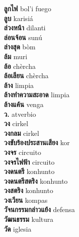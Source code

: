 \textbf{ ลูกไฟ  } bol’i fuego \\
\textbf{ ลูบ  } karisiá \\
\textbf{ ล่วงหน้า  } dilanti \\
\textbf{ ล่อนจ้อน  } sunú \\
\textbf{ ล่างสุด  } bòm \\
\textbf{ ล้ม  } muri \\
\textbf{ ล้อ  } chèrcha \\
\textbf{ ล้อเลียน  } chèrcha \\
\textbf{ ล้าง  } limpia \\
\textbf{ ล้างทำความสะอาด  } limpia \\
\textbf{ ล้างแค้น  } venga \\
\textbf{ ว.  } atverbio \\
\textbf{ วง  } cirkel \\
\textbf{ วงกลม  } cirkel \\
\textbf{ วงขับร้องประสานเสียง  } kor \\
\textbf{ วงจร  } circuito \\
\textbf{ วงจรไฟฟ้า  } circuito \\
\textbf{ วงดนตรี  } konhunto \\
\textbf{ วงดนตรีสตริง  } konhunto \\
\textbf{ วงสตริง  } konhunto \\
\textbf{ วงเวียน  } kompas \\
\textbf{ วัจนกรรมกล่าวแย้ง  } defensa \\
\textbf{ วัฒนธรรม  } kultura \\
\textbf{ วัด  } iglesia \\
